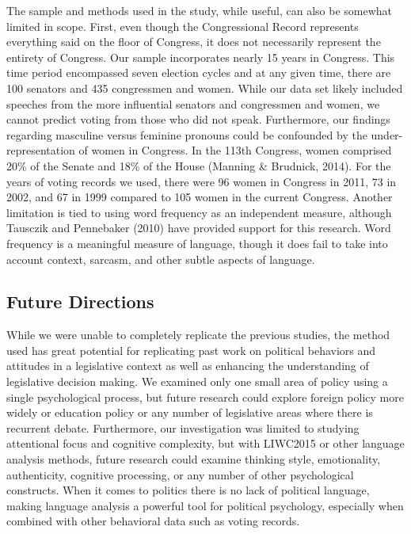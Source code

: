 \documentclass[english,,man]{apa6}
\begin{document}
The sample and methods used in the study, while useful, can also be somewhat limited in scope. First, even though the Congressional Record represents everything said on the floor of Congress, it does not necessarily represent the entirety of Congress. Our sample incorporates nearly 15 years in Congress. This time period encompassed seven election cycles and at any given time, there are 100 senators and 435 congressmen and women. While our data set likely included speeches from the more influential senators and congressmen and women, we cannot predict voting from those who did not speak. Furthermore, our findings regarding masculine versus feminine pronouns could be confounded by the under-representation of women in Congress. In the 113th Congress, women comprised 20\% of the Senate and 18\% of the House (Manning \& Brudnick, 2014). For the years of voting records we used, there were 96 women in Congress in 2011, 73 in 2002, and 67 in 1999 compared to 105 women in the current Congress. Another limitation is tied to using word frequency as an independent measure, although Tausczik and Pennebaker (2010) have provided support for this research. Word frequency is a meaningful measure of language, though it does fail to take into account context, sarcasm, and other subtle aspects of language.

\hypertarget{future-directions}{%
\subsection{Future Directions}\label{future-directions}}

While we were unable to completely replicate the previous studies, the method used has great potential for replicating past work on political behaviors and attitudes in a legislative context as well as enhancing the understanding of legislative decision making. We examined only one small area of policy using a single psychological process, but future research could explore foreign policy more widely or education policy or any number of legislative areas where there is recurrent debate. Furthermore, our investigation was limited to studying attentional focus and cognitive complexity, but with LIWC2015 or other language analysis methods, future research could examine thinking style, emotionality, authenticity, cognitive processing, or any number of other psychological constructs. When it comes to politics there is no lack of political language, making language analysis a powerful tool for political psychology, especially when combined with other behavioral data such as voting records.
\end{document}
